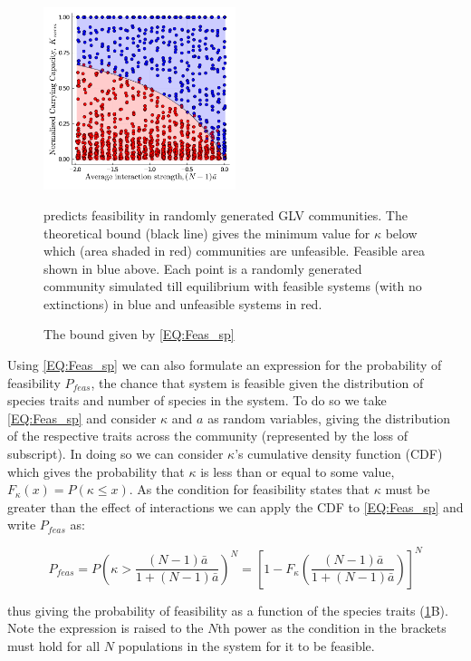 \documentclass{article}
\begin{document}
\begin{figure}[h] 
    \centering
    \includegraphics[width = 0.5\textwidth]{docs/Figures/Fig_1.pdf}
    \caption[width = 0.1\textwidth]{The bound given by \cref{EQ:Feas_sp}} predicts feasibility in randomly generated GLV communities. The theoretical bound (black line) gives the minimum value for $\kappa$ below which (area shaded in red) communities are unfeasible. Feasible area shown in blue above. Each point is a randomly generated community simulated till equilibrium with feasible systems (with no extinctions) in blue and unfeasible systems in red. 
    \label{Fig:Feasability_Bound}
\end{figure}

Using \cref{EQ:Feas_sp} we can also formulate an expression for the probability of feasibility $P_{feas}$, the chance that system is feasible given the distribution of species traits and number of species in the system. To do so we take \cref{EQ:Feas_sp} and consider $\kappa$ and $a$ as random variables, giving the distribution of the respective traits across the community (represented by the loss of subscript). In doing so we can consider $\kappa$'s cumulative density function (CDF) which gives the probability that $\kappa$ is less than or equal to some value, $F_{\kappa}(x) = P(\kappa \leq x)$. As the condition for feasibility states that $\kappa$ must be greater than the effect of interactions we can apply the CDF to \cref{EQ:Feas_sp} and write $P_{feas}$ as:

\begin{equation} \label{EQ:P_feas}
    P_{feas} = P \left( \kappa > \frac{(N-1)\bar{a}}{1 + (N-1)\bar{a}}  \right)^N = 
    \left[1 - F_{\kappa}\left(\frac{(N-1)\bar{a}}{1 + (N-1)\bar{a}}\right)\right]^N
\end{equation}

thus giving the probability of feasibility as a function of the species traits (\cref{Fig:Feasability_Bound}B). Note the expression is raised to the $N$th power as the condition in the brackets must hold for all $N$ populations in the system for it to be feasible. 
\end{document}

